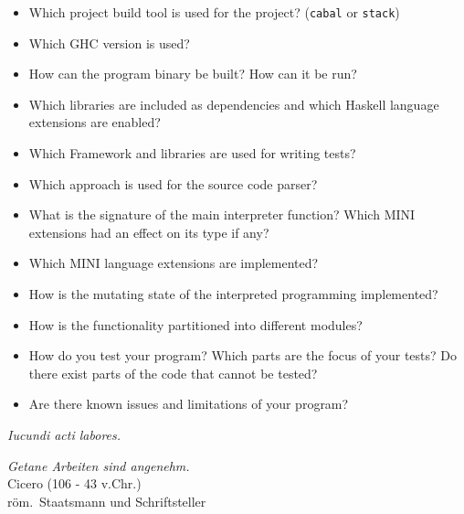 \documentclass{article}
\begin{document}
\begin{itemize}
\item Which project build tool is used for the project? (\texttt{cabal} or \texttt{stack})
\item Which GHC version is used?
\item How can the program binary be built? How can it be run?
\item Which libraries are included as dependencies and which Haskell language extensions are enabled?
\item Which Framework and libraries are used for writing tests?
\item Which approach is used for the source code parser?
\item What is the signature of the main interpreter function? Which MINI extensions had an effect on its type if any?
\item Which MINI language extensions are implemented?
\item How is the mutating state of the interpreted programming implemented?
\item How is the functionality partitioned into different modules?
\item How do you test your program? Which parts are the focus of your tests? Do there exist parts of the code that cannot be tested?
\item Are there known issues and limitations of your program?
\end{itemize}

\vspace*{1cm}

\noindent
\hfill \emph{Iucundi acti labores.}  \\
\vspace*{-0.45cm}

\hfill \emph{Getane Arbeiten sind angenehm.}\\

\vspace*{-0.3cm}
\hfill Cicero (106 - 43 v.Chr.) \\

\vspace*{-0.45cm}
\hfill r\"om.~Staatsmann und Schriftsteller \\
\end{document}
